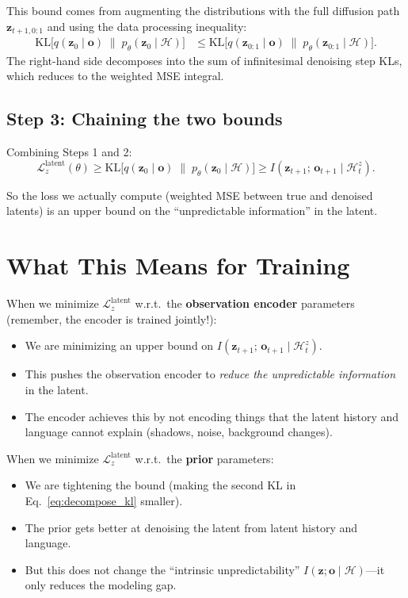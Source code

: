 \documentclass{article}
\newcommand{\vo}{\bm{o}}
\newcommand{\vz}{\bm{z}}
\newcommand{\loss}{\mathcal{L}}
\newcommand{\KL}{\mathrm{KL}}
\begin{document}
This bound comes from augmenting the distributions with the full diffusion path $\vz_{t+1,0:1}$ and using the data processing inequality:
\begin{align}
  \KL\!\big[q(\vz_0 \mid \vo) \;\|\; p_\theta(\vz_0 \mid \mathcal{H})\big]
  &\leq \KL\!\big[q(\vz_{0:1} \mid \vo) \;\|\; p_\theta(\vz_{0:1} \mid \mathcal{H})\big].
\end{align}
The right-hand side decomposes into the sum of infinitesimal denoising step KLs, which reduces to the weighted MSE integral.

\subsection{Step 3: Chaining the two bounds}

Combining Steps 1 and 2:
\begin{equation}
  \boxed{\loss_z^{\text{latent}}(\theta) \geq \KL\!\big[q(\vz_0 \mid \vo) \;\|\; p_\theta(\vz_0 \mid \mathcal{H})\big] \geq I(\vz_{t+1};\, \vo_{t+1} \mid \mathcal{H}_t^z).}
  \label{eq:chain}
\end{equation}

So the loss we actually compute (weighted MSE between true and denoised latents) is an upper bound on the ``unpredictable information'' in the latent.

\section{What This Means for Training}

When we minimize $\loss_z^{\text{latent}}$ w.r.t.\ the \textbf{observation encoder} parameters (remember, the encoder is trained jointly!):
\begin{itemize}[leftmargin=*]
  \item We are minimizing an upper bound on $I(\vz_{t+1};\, \vo_{t+1} \mid \mathcal{H}_t^z)$.
  \item This pushes the observation encoder to \emph{reduce the unpredictable information} in the latent.
  \item The encoder achieves this by not encoding things that the latent history and language cannot explain (shadows, noise, background changes).
\end{itemize}

When we minimize $\loss_z^{\text{latent}}$ w.r.t.\ the \textbf{prior} parameters:
\begin{itemize}[leftmargin=*]
  \item We are tightening the bound (making the second KL in Eq.~\ref{eq:decompose_kl} smaller).
  \item The prior gets better at denoising the latent from latent history and language.
  \item But this does not change the ``intrinsic unpredictability'' $I(\vz; \vo \mid \mathcal{H})$---it only reduces the modeling gap.
\end{itemize}
\end{document}
